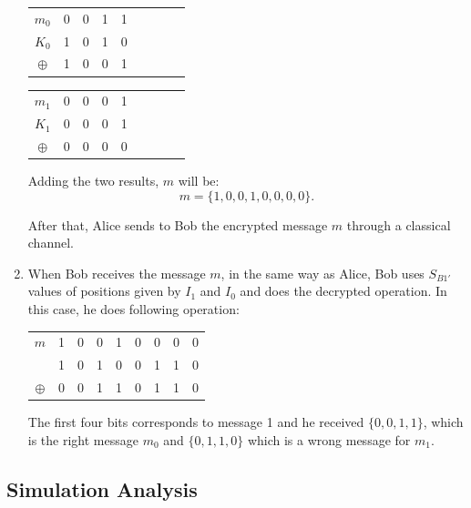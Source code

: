 \begin{enumerate}
   \begin{table}[H]
    \centering
    \begin{tabular}{c|c c c c c c c c}
     $m_{0}$ & 0 & 0 & 1 & 1 \\
     $K_{0}$ & 1 & 0 & 1 & 0 \\ \hline
     $\oplus$ & 1 & 0 & 0 & 1
    \end{tabular}
    \end{table}

   \begin{table}[H]
    \centering
    \begin{tabular}{c|c c c c c c c c}
     $m_{1}$ & 0 & 0 & 0 & 1 \\
     $K_{1}$ & 0 & 0 & 0 & 1 \\ \hline
     $\oplus$ & 0 & 0 & 0 & 0
    \end{tabular}
    \end{table}

    Adding the two results, $m$ will be: $$m=\{1,0,0,1,0,0,0,0\}.$$

   After that, Alice sends to Bob the encrypted message $m$ through a classical channel.

  \item When Bob receives the message $m$, in the same way as Alice, Bob uses $S_{B1\prime}$ values of positions given by $I_{1}$ and $I_{0}$ and does the decrypted operation. In this case, he does following operation:

      \begin{table}[H]
        \centering
        \begin{tabular}{c|c c c c c c c c}
         $m$ & 1 & 0 & 0 & 1 & 0 & 0 & 0 & 0 \\
             & 1 & 0 & 1 & 0 & 0 & 1 & 1 & 0 \\ \hline
         $\oplus$ & 0 & 0 & 1 & 1 & 0 & 1 & 1 & 0 \\
        \end{tabular}
        \end{table}

      The first four bits corresponds to message 1 and he received $\{0,0,1,1\}$, which is the right message $m_{0}$ and $\{0,1,1,0\}$ which is a wrong message for $m_{1}$.


\end{enumerate}

\newpage

\subsection{Simulation Analysis}

